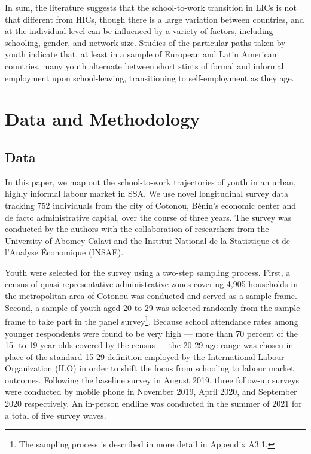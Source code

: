\documentclass[
  a4paper, twoside, 12pt]{book}
\begin{document}
In sum, the literature suggests that the school-to-work transition in LICs is not that different from HICs, though there is a large variation between countries, and at the individual level can be influenced by a variety of factors, including schooling, gender, and network size. Studies of the particular paths taken by youth indicate that, at least in a sample of European and Latin American countries, many youth alternate between short stints of formal and informal employment upon school-leaving, transitioning to self-employment as they age.

\hypertarget{survey-datamethods}{%
\section{Data and Methodology}\label{survey-datamethods}}

\hypertarget{survey-data}{%
\subsection*{Data}\label{survey-data}}

In this paper, we map out the school-to-work trajectories of youth in an urban, highly informal labour market in SSA. We use novel longitudinal survey data tracking 752 individuals from the city of Cotonou, Bénin's economic center and de facto administrative capital, over the course of three years. The survey was conducted by the authors with the collaboration of researchers from the University of Abomey-Calavi and the Institut National de la Statistique et de l'Analyse Économique (INSAE).

Youth were selected for the survey using a two-step sampling process. First, a census of quasi-representative administrative zones covering 4,905 households in the metropolitan area of Cotonou was conducted and served as a sample frame. Second, a sample of youth aged 20 to 29 was selected randomly from the sample frame to take part in the panel survey\footnote{The sampling process is described in more detail in Appendix A3.1.}. Because school attendance rates among younger respondents were found to be very high --- more than 70 percent of the 15- to 19-year-olds covered by the census --- the 20-29 age range was chosen in place of the standard 15-29 definition employed by the International Labour Organization (ILO) in order to shift the focus from schooling to labour market outcomes. Following the baseline survey in August 2019, three follow-up surveys were conducted by mobile phone in November 2019, April 2020, and September 2020 respectively. An in-person endline was conducted in the summer of 2021 for a total of five survey waves.
\end{document}
